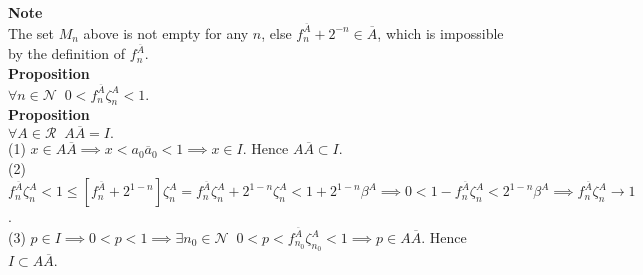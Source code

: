 \documentclass{article}
\newcommand{\targetset}{ \mathscr{R}}
\newcommand{\naturals}{ \mathscr{N}}
\newcommand{\invmark}{\overline}
\newcommand{\umbrella}{\beta}
\newcommand{\prevert}{\zeta}
\begin{document}
\textbf{Note}\\
The set $M_n$  above is not empty for any $n$, else $f^{\invmark A}_n + 2^{-n} \in \invmark A$, which is impossible by the definition of $f^{\invmark A}_n$.\\

\textbf{Proposition}\\
$\forall n \in \naturals \;\; 0 < f^{\invmark A}_n \prevert^{ A}_n < 1.$\\




\textbf{Proposition}\\
$\forall A \in \targetset \;\;  A \invmark A = I.$ \\

(1) $x \in A \invmark A \implies x < a_0 \invmark a_0 < 1 \implies x \in I$. Hence $A \invmark A \subset I$.\\  
(2) $ f^{\invmark A}_n \prevert^{A}_n < 1 \le [f^{\invmark A}_n +2^{1-n}] \prevert^{ A}_n = f^{\invmark A}_n \prevert^{ A}_n + 2^{1-n}\prevert^{A}_n < 1 + 2^{1-n}\umbrella^A \implies 0 < 1 - f^{\invmark A}_n \prevert^{ A}_n < 2^{1-n}\umbrella^A   \implies f^{\invmark A}_n \prevert^{ A}_n \to 1$.\\
(3) $ p \in I \implies 0 < p < 1 \implies \exists n_0 \in \naturals \;\; 0 < p <  f^{\invmark A}_{n_0}  \prevert^{ A}_{n_0} < 1 \implies p \in A \invmark A$. Hence $ I \subset A \invmark A $.\\ \\
\end{document}
